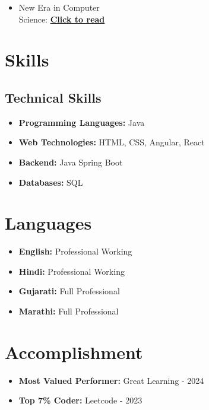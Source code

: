 \documentclass[]{sameer-resume-openfont}
\begin{document}
\begin{minipage}[t]{0.33\textwidth}
\begin{itemize}
        \item New Era in Computer \\ Science: \href{https://sameerrathod99.wordpress.com/}{\bf Click to read} 
    \end{itemize}
    \sectionsep


\section{Skills}
\subsection{Technical Skills}
\begin{itemize}
    \item \textbf{Programming Languages:} Java
    \item \textbf{Web Technologies:} HTML, CSS, Angular, React
    \item \textbf{Backend:} Java Spring Boot
    \item \textbf{Databases:} SQL
\end{itemize}
\sectionsep


\section{Languages}
\begin{itemize}
    \item \textbf{English:} Professional Working
    \item \textbf{Hindi:} Professional Working
    \item \textbf{Gujarati:} Full Professional
    \item \textbf{Marathi:} Full Professional
\end{itemize}
\sectionsep


\section{Accomplishment}
\begin{itemize}
    \item \textbf{Most Valued Performer:} Great Learning - 2024
    \item \textbf{Top 7\% Coder:} Leetcode - 2023
\end{itemize}
\sectionsep

%
%

\end{minipage} 
\end{document}
